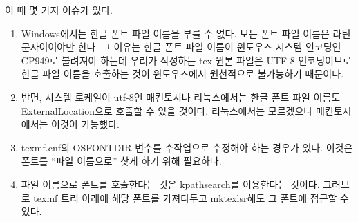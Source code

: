 \documentclass[
	12pt,
	a4paper,
	kosection,
	footnote,
	nobookmarks,
	microtype,
	figtabcapt,
]{oblivoir}
\def\myLabel#1#2{\label{#1}}
\def\myLabel#1#2{\label{#2}}
\begin{document}
이 때 몇 가지 이슈가 있다.
\begin{enumerate}[(가)]\tightlist
\item Windows에서는 한글 폰트 파일 이름을 부를 수 없다. 모든 폰트 파일 이름은
라틴 문자이어야만 한다. 그 이유는 한글 폰트 파일 이름이 윈도우즈 시스템 인코딩인
CP949로 불려져야 하는데 우리가 작성하는 tex 원본 파일은 UTF-8 인코딩이므로
한글 파일 이름을 호출하는 것이 윈도우즈에서 원천적으로 불가능하기 때문이다.

\item 반면, 시스템 로케일이 utf-8인 매킨토시나 리눅스에서는 한글 폰트 파일 이름도
ExternalLocation으로 호출할 수 있을 것이다. 리눅스에서는 모르겠으나 매킨토시에서는
이것이 가능했다.

\item texmf.cnf의 OSFONTDIR 변수를 수작업으로 수정해야 하는 경우가 있다. 
이것은 폰트를 ``파일 이름으로'' 찾게 하기 위해 필요하다.

\item 파일 이름으로 폰트를 호출한다는 것은 kpathsearch를 이용한다는
것이다. 그러므로 texmf 트리 아래에 해당 폰트를 가져다두고 mktexlsr해도 그
폰트에 접근할 수 있다.

\end{enumerate}


\end{document}
